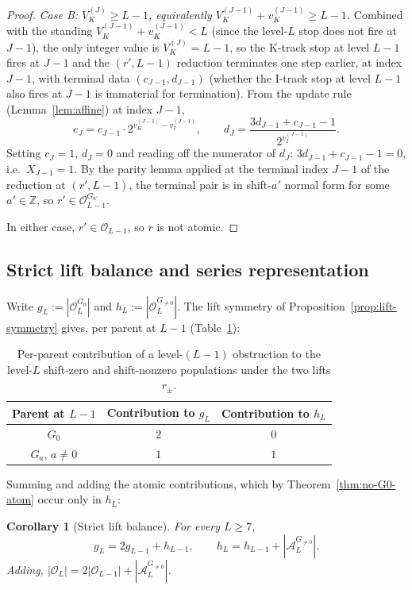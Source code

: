 \documentclass[11pt,reqno]{amsart}
\theoremstyle{plain}
\newtheorem{corollary}[theorem]{Corollary}
\theoremstyle{definition}
\theoremstyle{remark}
\newcommand{\Z}{\mathbb{Z}}
\newcommand{\Obs}{\mathcal{O}}
\newcommand{\Atom}{\mathcal{A}}
\newcommand{\Vk}{V_{K}}
\newcommand{\vk}{v_{K}}
\newcommand{\vi}{v_{I}}
\begin{document}
\begin{proof}
\emph{Case B: $\Vk^{(J)} \ge L - 1$, equivalently
$\Vk^{(J-1)} + \vk^{(J-1)} \ge L - 1$.} Combined with the standing
$\Vk^{(J-1)} + \vk^{(J-1)} < L$ (since the level-$L$ stop does not fire
at $J - 1$), the only integer value is $\Vk^{(J)} = L - 1$, so the
K-track stop at level $L - 1$ fires at $J - 1$ and the $(r', L-1)$
reduction terminates one step earlier, at index $J - 1$, with terminal
data $(c_{J-1}, d_{J-1})$ (whether the I-track stop at level $L - 1$
also fires at $J - 1$ is immaterial for termination). From the update
rule (Lemma~\ref{lem:affine}) at index $J - 1$,
\[
c_J = c_{J-1} \cdot 2^{\vk^{(J-1)} - \vi^{(J-1)}}, \qquad d_J = \frac{3 d_{J-1} + c_{J-1} - 1}{2^{\vi^{(J-1)}}}.
\]
Setting $c_J = 1$, $d_J = 0$ and reading off the numerator of $d_J$:
$3 d_{J-1} + c_{J-1} - 1 = 0$, i.e.\ $X_{J-1} = 1$. By the parity lemma
applied at the terminal index $J - 1$ of the reduction at $(r', L-1)$,
the terminal pair is in shift-$a'$ normal form for some $a' \in \Z$, so
$r' \in \Obs_{L-1}^{G_{a'}}$.

In either case, $r' \in \Obs_{L-1}$, so $r$ is not atomic. \qedhere
\end{proof}

\subsection{Strict lift balance and series representation}

Write $g_L := |\Obs_L^{G_0}|$ and $h_L := |\Obs_L^{G_{\ne 0}}|$. The lift
symmetry of Proposition~\ref{prop:lift-symmetry} gives, per parent at
$L - 1$ (Table~\ref{tab:lift-balance}):

\begin{table}[h]
\centering
\begin{tabular}{c|cc}
\toprule
Parent at $L-1$ & Contribution to $g_L$ & Contribution to $h_L$ \\
\midrule
$G_0$ & $2$ & $0$ \\
$G_a$, $a \ne 0$ & $1$ & $1$ \\
\bottomrule
\end{tabular}
\caption{Per-parent contribution of a level-$(L-1)$ obstruction to the level-$L$ shift-zero and shift-nonzero populations under the two lifts $r_\pm$.}
\label{tab:lift-balance}
\end{table}

Summing and adding the atomic contributions, which by Theorem~\ref{thm:no-G0-atom}
occur only in $h_L$:

\begin{corollary}[Strict lift balance]
\label{cor:lift-balance}
For every $L \ge 7$,
\[
g_L = 2 g_{L-1} + h_{L-1}, \qquad h_L = h_{L-1} + |\Atom_L^{G_{\ne 0}}|.
\]
Adding, $|\Obs_L| = 2 |\Obs_{L-1}| + |\Atom_L^{G_{\ne 0}}|$.
\end{corollary}
\end{document}
